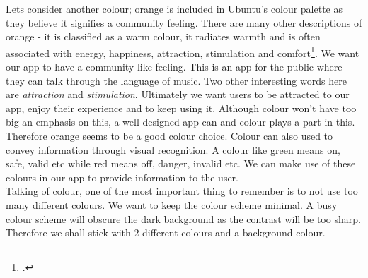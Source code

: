 Lets consider another colour; orange is included in Ubuntu's colour palette as they believe it signifies a community feeling.  There are many other descriptions of orange - it is classified as a warm colour, it radiates warmth and is often associated with energy, happiness, attraction, stimulation and comfort\footcite{market-share}.  We want our app to have a community like feeling.  This is an app for the public where they can talk through the language of music.  Two other interesting words here are \emph{attraction} and \emph{stimulation}.  Ultimately we want users to be attracted to our app, enjoy their experience and to keep using it.  Although colour won't have too big an emphasis on this, a well designed app can and colour plays a part in this.  Therefore orange seems to be a good colour choice.  
Colour can also used to convey information through visual recognition.  A colour like green means on, safe, valid etc while red means off, danger, invalid etc.  We can make use of these colours in our app to provide information to the user.  \\
Talking of colour, one of the most important thing to remember is to not use too many different colours.  We want to keep the colour scheme minimal.  A busy colour scheme will obscure the dark background as the contrast will be too sharp.  Therefore we shall stick with 2 different colours and a background colour.  \\

